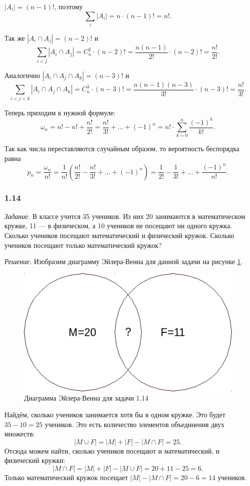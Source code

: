 $ |A_i| = \left( n-1 \right)!$, поэтому
$$ \sum \limits_i |A_i| = n \cdot \left( n-1 \right)! = n!.$$

Так же $ |A_i \cap A_j| = \left( n-2 \right)!$ и
$$ \sum \limits_{i<j} |A_i \cap A_j| = C_n^2 \cdot \left( n-2 \right)! = \frac{n \left( n-1 \right)}{2!} \cdot \left( n-2 \right)! = \frac{n!}{2!}.$$

Аналогично $ |A_i \cap A_j \cap A_k| = \left( n-3 \right)!$ и
$$ \sum \limits_{i<j<k} |A_i \cap A_j \cap A_k| =
C_n^3 \cdot \left( n-3 \right)! =
\frac{n \left( n-1 \right) \left( n-3 \right) }{3!} \cdot \left( n-3 \right)! =
\frac{n!}{3!}.$$

Теперь приходим к нужной формуле:
$$ \omega_n =
n! - n! + \frac{n!}{2!} =
\frac{n!}{3!} + \dotsc + \left( -1 \right)^n =
n! \cdot \sum \limits_{k=0}^n \frac{ \left( -1 \right)^k }{k!}.$$

Так как числа переставляются случайным образом, то вероятность беспорядка равна
$$ p_n =
\frac{ \omega_n }{n!} =
\frac{1}{n!} \left( \frac{n!}{2!} - \frac{n!}{3!} + \dotsc + \left( -1 \right)^n \right) =
\frac{1}{2!} - \frac{1}{3!} + \dotsc + \frac{ \left( -1 \right)^n}{n!}.$$

\subsubsection*{1.14}

\textit{Задание.} В классе учится 35 учеников.
Из них 20 занимаются в математическом кружке, 11 --- в физическом, а 10 учеников не посещают ни одного кружка.
Сколько учеников посещают математический и физический кружок.
Сколько учеников посещают только математический кружок?

\textit{Решение.} Изобразим диаграмму Эйлера-Венна для данной задачи на рисунке \ref{fig:114}. 

\begin{figure}[h!]
  \centering
  \includegraphics[width=.4\textwidth]{./pictures/1_14.png}
  \caption{Диаграмма Эйлера-Венна для задачи 1.14}
  \label{fig:114}
\end{figure}

Найдём, сколько учеников занимается хотя бы в одном кружке.
Это будет $35-10=25$ учеников.
Это есть количество элементов объединения двух множеств:
$$ |M \cup F| =
|M| + |F| - |M \cap F| =
25.$$
Отсюда можем найти, сколько учеников посещают и математический, и физический кружки:
$$ |M \cap F| =
|M| + |F| - |M \cup F| =
20 + 11 - 25 = 6.$$
Только математический кружок посещает $ |M| - |M \cap F| = 20 - 6 = 14$ учеников.

